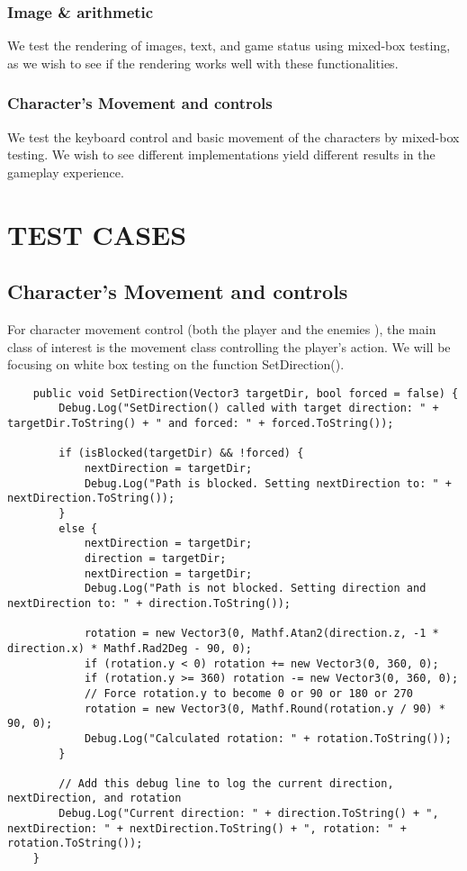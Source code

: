 \documentclass[11pt]{article}
\begin{document}
    \subsubsection*{Image \& arithmetic}
    We test the rendering of images, text, and game status using mixed-box testing, as we wish to see if the rendering works well with these functionalities.

    \subsubsection*{Character's Movement and controls}
    We test the keyboard control and basic movement of the characters by mixed-box testing. We wish to see different implementations yield different results in the gameplay experience.
    
    \section{TEST CASES}
    \subsection*{Character's Movement and controls}
    For character movement control (both the player and the enemies ), the main class of interest is the movement class controlling the player's action. We will be focusing on white box testing on the function SetDirection().

    
    \begin{lstlisting}
    public void SetDirection(Vector3 targetDir, bool forced = false) {
        Debug.Log("SetDirection() called with target direction: " + targetDir.ToString() + " and forced: " + forced.ToString());
    
        if (isBlocked(targetDir) && !forced) {
            nextDirection = targetDir;
            Debug.Log("Path is blocked. Setting nextDirection to: " + nextDirection.ToString());
        }
        else {
            nextDirection = targetDir;
            direction = targetDir;
            nextDirection = targetDir;
            Debug.Log("Path is not blocked. Setting direction and nextDirection to: " + direction.ToString());
    
            rotation = new Vector3(0, Mathf.Atan2(direction.z, -1 * direction.x) * Mathf.Rad2Deg - 90, 0);
            if (rotation.y < 0) rotation += new Vector3(0, 360, 0);
            if (rotation.y >= 360) rotation -= new Vector3(0, 360, 0);
            // Force rotation.y to become 0 or 90 or 180 or 270
            rotation = new Vector3(0, Mathf.Round(rotation.y / 90) * 90, 0);
            Debug.Log("Calculated rotation: " + rotation.ToString());
        }
    
        // Add this debug line to log the current direction, nextDirection, and rotation
        Debug.Log("Current direction: " + direction.ToString() + ", nextDirection: " + nextDirection.ToString() + ", rotation: " + rotation.ToString());
    }
    \end{lstlisting}
\end{document}
